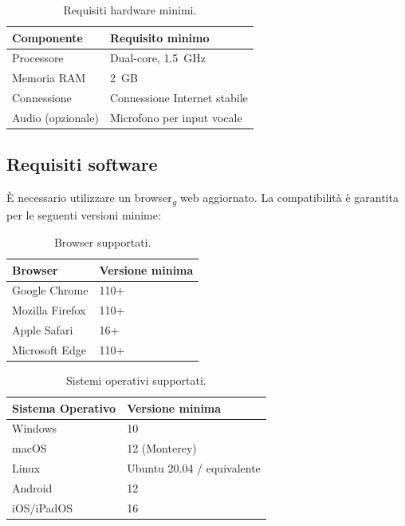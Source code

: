\documentclass[a4paper, 11pt, oneside]{scrartcl}
\begin{document}
\begin{table}[H]
    \centering
    \renewcommand{\arraystretch}{1.2}
    \begin{tabular}{ll}
        \toprule
        \textbf{Componente} & \textbf{Requisito minimo} \\
        \midrule
        Processore  & Dual-core, 1.5~GHz \\
        Memoria RAM & 2~GB \\
        Connessione & Connessione Internet stabile \\
        Audio (opzionale) & Microfono per input vocale \\
        \bottomrule
    \end{tabular}
    \caption{Requisiti hardware minimi.}
    \label{tab:req-hw}
\end{table}

\subsection{Requisiti software}
\`E necessario utilizzare un browser\textsubscript{\textit{g}} web aggiornato. La compatibilit\`a \`e garantita per le seguenti versioni minime:

\begin{table}[H]
    \centering
    \renewcommand{\arraystretch}{1.2}
    \begin{tabular}{ll}
        \toprule
        \textbf{Browser} & \textbf{Versione minima} \\
        \midrule
        Google Chrome   & 110+ \\
        Mozilla Firefox & 110+ \\
        Apple Safari    & 16+ \\
        Microsoft Edge  & 110+ \\
        \bottomrule
    \end{tabular}
    \caption{Browser supportati.}
    \label{tab:req-browser}
\end{table}

\begin{table}[H]
    \centering
    \renewcommand{\arraystretch}{1.2}
    \begin{tabular}{ll}
        \toprule
        \textbf{Sistema Operativo} & \textbf{Versione minima} \\
        \midrule
        Windows    & 10 \\
        macOS      & 12 (Monterey) \\
        Linux      & Ubuntu 20.04 / equivalente \\
        Android    & 12 \\
        iOS/iPadOS & 16 \\
        \bottomrule
    \end{tabular}
    \caption{Sistemi operativi supportati.}
    \label{tab:req-os}
\end{table}
\end{document}
